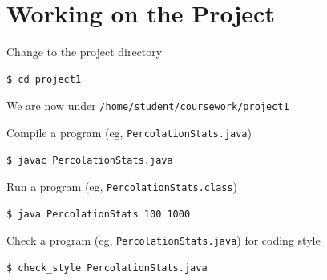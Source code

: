 \documentclass[8pt,a4paper,compress]{beamer}
\begin{document}
\section{Working on the Project}
\begin{frame}[fragile]
\pause

Change to the project directory

\begin{tcolorbox}[enhanced,drop shadow southwest,sharp corners,size=fbox,colback=black]
\begin{lstlisting}[style=terminal]
$ cd project1
\end{lstlisting}
\end{tcolorbox}

\pause\bigskip

We are now under \lstinline{/home/student/coursework/project1}

\pause\bigskip

Compile a program (eg, \lstinline{PercolationStats.java})

\begin{tcolorbox}[enhanced,drop shadow southwest,sharp corners,size=fbox,colback=black]
\begin{lstlisting}[style=terminal]
$ javac PercolationStats.java
\end{lstlisting}
\end{tcolorbox}

\pause\bigskip

Run a program (eg, \lstinline{PercolationStats.class})

\begin{tcolorbox}[enhanced,drop shadow southwest,sharp corners,size=fbox,colback=black]
\begin{lstlisting}[style=terminal]
$ java PercolationStats 100 1000
\end{lstlisting}
\end{tcolorbox}

\pause\bigskip

Check a program (eg, \lstinline{PercolationStats.java}) for coding style

\begin{tcolorbox}[enhanced,drop shadow southwest,sharp corners,size=fbox,colback=black]
\begin{lstlisting}[style=terminal]
$ check_style PercolationStats.java
\end{lstlisting}
\end{tcolorbox}
\end{frame}
\end{document}
